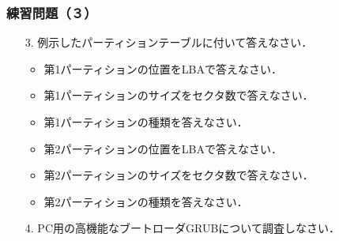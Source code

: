 \documentclass[unicode,handout]{beamer}                   %
\begin{document}
\begin{frame}
  \frametitle{練習問題（３）}
  \begin{enumerate}
  \item[3.] 例示したパーティションテーブルに付いて答えなさい．
    \begin{itemize}
    \item 第1パーティションの位置をLBAで答えなさい．
    \item 第1パーティションのサイズをセクタ数で答えなさい．
    \item 第1パーティションの種類を答えなさい．
    \item 第2パーティションの位置をLBAで答えなさい．
    \item 第2パーティションのサイズをセクタ数で答えなさい．
    \item 第2パーティションの種類を答えなさい．
    \end{itemize}
    \vfill
  \item[4.] PC用の高機能なブートローダGRUBについて調査しなさい．
    \vfill
  \end{enumerate}
\end{frame}

\end{document}
